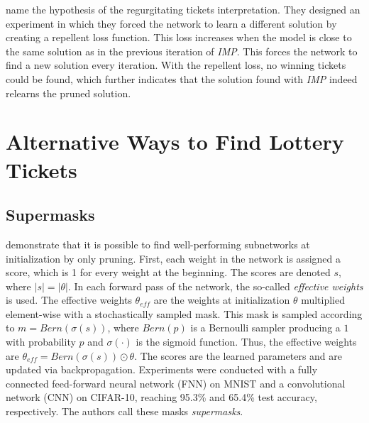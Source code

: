 \textcite{maene_towards_2021} name the hypothesis of \autocite{WhyLotteryTicketsWin} the regurgitating tickets interpretation.
They designed an experiment in which they forced the network to learn a different solution by creating a repellent loss function.
This loss increases when the model is close to the same solution as in the previous iteration of \textit{IMP}.
This forces the network to find a new solution every iteration.
With the repellent loss, no winning tickets could be found, which further indicates that the solution found with \textit{IMP} indeed relearns the pruned solution.

\section{Alternative Ways to Find Lottery Tickets}
\subsection{Supermasks}
\textcite{Supermasks} demonstrate that it is possible to find well-performing subnetworks at initialization by only pruning.
First, each weight in the network is assigned a score, which is 1 for every weight at the beginning. 
The scores are denoted $s$, where $|s| = |\theta|$.
In each forward pass of the network, the so-called \textit{effective weights} is used.
The effective weights $\theta_{eff}$ are the weights at initialization $\theta$ multiplied element-wise with a stochastically sampled mask.
This mask is sampled according to $m = \textit{Bern}(\sigma(s))$, where $\textit{Bern}(p)$ is a Bernoulli sampler producing a $1$ with probability $p$ and $\sigma(\cdot)$ is the sigmoid function. 
Thus, the effective weights are $\theta_{eff} = \textit{Bern}(\sigma(s)) \odot \theta$.
The scores are the learned parameters and are updated via backpropagation.
Experiments were conducted with a fully connected feed-forward neural network (FNN) on MNIST and a convolutional network (CNN) on CIFAR-10, reaching 95.3\% and 65.4\% test accuracy, respectively.
The authors call these masks \textit{supermasks}.

